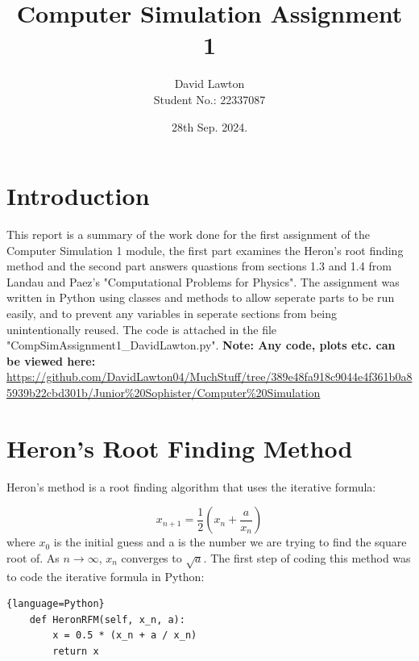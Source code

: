\documentclass{article}
\title{Computer Simulation Assignment 1}
\author{David Lawton\\ Student No.: 22337087}
\date{28th Sep. 2024.}
\theoremstyle{definition}
\theoremstyle{remark}
\begin{document}
\maketitle

\tableofcontents


\section{Introduction}
This report is a summary of the work done for the first assignment of the Computer Simulation 1 module, the first part examines the Heron's root finding method and the second part answers quastions from sections 1.3 and 1.4 from Landau and Paez's "Computational Problems for Physics". The assignment was written in Python using classes and methods to allow seperate parts to be run easily, and to prevent any variables in seperate sections from being unintentionally reused. The code is attached in the file "CompSimAssignment1\_DavidLawton.py".
\textbf{Note: Any code, plots etc. can be viewed here:} \url{https://github.com/DavidLawton04/MuchStuff/tree/389e48fa918c9044e4f361b0a85939b22cbd301b/Junior%20Sophister/Computer%20Simulation}

\section{Heron's Root Finding Method}

Heron's method is a root finding algorithm that uses the iterative formula:

\begin{equation}
    x_{n+1} = \frac{1}{2} \left( x_n + \frac{a}{x_n} \right)
\end{equation}
where $x_0$ is the initial guess and a is the number we are trying to find the square root of. As $n\rightarrow\infty$, $x_n$ converges to $\sqrt{a}$. The first step of coding this method was to code the iterative formula in Python:
\begin{lstlisting}{language=Python}
    def HeronRFM(self, x_n, a):
        x = 0.5 * (x_n + a / x_n)
        return x
\end{lstlisting}
\end{document}

